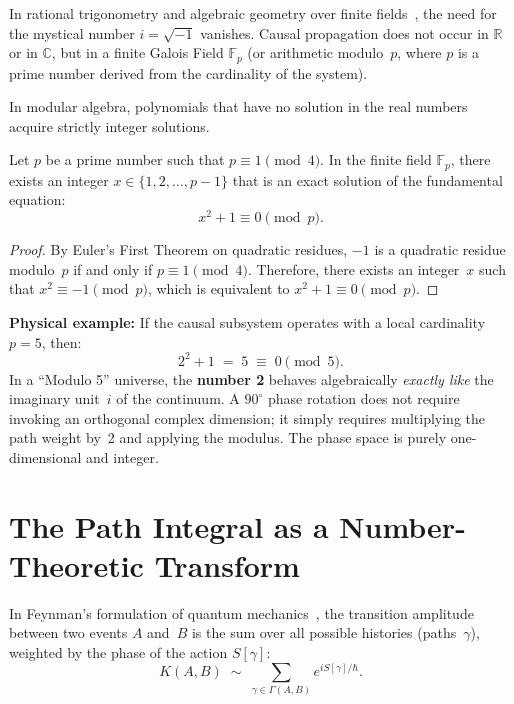 In rational trigonometry and algebraic geometry over finite
fields~\cite{wildberger2005}, the need for the mystical number
$i = \sqrt{-1}$ vanishes. Causal propagation does not occur in
$\mathbb{R}$ or in $\mathbb{C}$, but in a finite Galois Field
$\mathbb{F}_p$ (or arithmetic modulo~$p$, where $p$ is a prime number
derived from the cardinality of the system).

In modular algebra, polynomials that have no solution in the real numbers
acquire strictly integer solutions.

\begin{theorem}
\label{thm:discrete-i}
Let $p$ be a prime number such that $p \equiv 1 \pmod 4$. In the finite
field $\mathbb{F}_p$, there exists an integer
$x \in \{1, 2, \ldots, p-1\}$ that is an exact solution of the
fundamental equation:
\begin{equation}
  x^2 + 1 \equiv 0 \pmod p.
  \label{eq:discrete-i}
\end{equation}
\end{theorem}

\begin{proof}
By Euler's First Theorem on quadratic residues, $-1$ is a quadratic
residue modulo~$p$ if and only if $p \equiv 1 \pmod 4$. Therefore, there
exists an integer~$x$ such that $x^2 \equiv -1 \pmod p$, which is
equivalent to $x^2 + 1 \equiv 0 \pmod p$.
\end{proof}

\noindent
\textbf{Physical example:} If the causal subsystem operates with a local
cardinality $p = 5$, then:
\[
  2^2 + 1 \;=\; 5 \;\equiv\; 0 \pmod 5.
\]
In a ``Modulo 5'' universe, the \textbf{number 2} behaves algebraically
\emph{exactly like} the imaginary unit~$i$ of the continuum. A
$90^\circ$ phase rotation does not require invoking an orthogonal complex
dimension; it simply requires multiplying the path weight by~2 and
applying the modulus. The phase space is purely one-dimensional and
integer.

\section{The Path Integral as a Number-Theoretic Transform}
\label{sec:ntt}

In Feynman's formulation of quantum
mechanics~\cite{feynman1948}, the transition amplitude between two
events $A$ and~$B$ is the sum over all possible histories
(paths~$\gamma$), weighted by the phase of the action
$S[\gamma]$:
\begin{equation}
  K(A,B) \;\sim\; \sum_{\gamma \in \Gamma(A,B)} e^{i S[\gamma] / \hbar}.
  \label{eq:feynman-path}
\end{equation}

